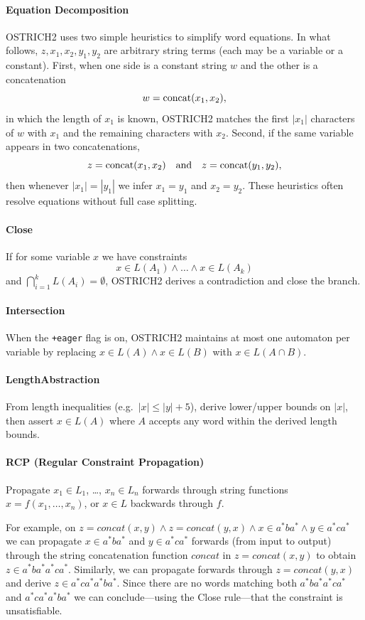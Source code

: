 \paragraph{Equation Decomposition}
OSTRICH2 uses two simple heuristics to simplify word equations.  In what follows, $z,x_1,x_2,y_1,y_2$ are arbitrary string terms (each may be a variable or a constant).
First, when one side is a constant string $w$ and the other is a concatenation
\[
w = \operatorname{concat}(x_1,x_2),
\]
in which the length of $x_1$ is known,
OSTRICH2 matches the first $|x_1|$ characters of $w$ with $x_1$ and the remaining characters with $x_2$. Second, if the same variable appears in two concatenations,
\[
z = \operatorname{concat}(x_1,x_2)
\quad\text{and}\quad
z = \operatorname{concat}(y_1,y_2),
\]
then whenever $|x_1| = |y_1|$ we infer $x_1 = y_1$ and $x_2 = y_2$. These heuristics often resolve equations without full case splitting.

\paragraph{Close}
If for some variable $x$ we have constraints
\[
    x \in L(A_1) \land \dots \land x \in L(A_k)
\]
and $\bigcap_{i=1}^k L(A_i)=\emptyset$, OSTRICH2 derives a contradiction and close the branch.

\paragraph{Intersection}
When the \texttt{+eager} flag is on, OSTRICH2 maintains at most one automaton per variable by replacing $x \in L(A) \land x \in L(B)$ with $x \in L(A \cap B)$.

\paragraph{LengthAbstraction}
From length inequalities (e.g.\ $|x|\le|y|+5$), derive lower/upper bounds on $|x|$, then assert $x \in L(A)$ where $A$ accepts any word within the derived length bounds.


\paragraph{RCP (Regular Constraint Propagation)}
Propagate $x_1 \in L_1$, \ldots, $x_n \in L_n$ forwards through string functions $x=f(x_1,\dots,x_n)$, or $x \in L$ backwards through $f$.

For example, on
$z = concat(x,y) \wedge z = concat(y,x) \wedge x \in a^*ba^* \wedge y \in a^*ca^*$
we can propagate $x \in a^*ba^*$ and $y \in a^*ca^*$ forwards (from input to output) through the string concatenation function $concat$ in $z = concat(x, y)$ to obtain $z \in a^*ba^*a^*ca^*$.
Similarly, we can propagate forwards through $z = concat(y, x)$ and derive $z \in a^*ca^*a^*ba^*$.
Since there are no words matching both $a^*ba^*a^*ca^*$ and $a^*ca^*a^*ba^*$ we can conclude---using the Close rule---that the constraint is unsatisfiable.

